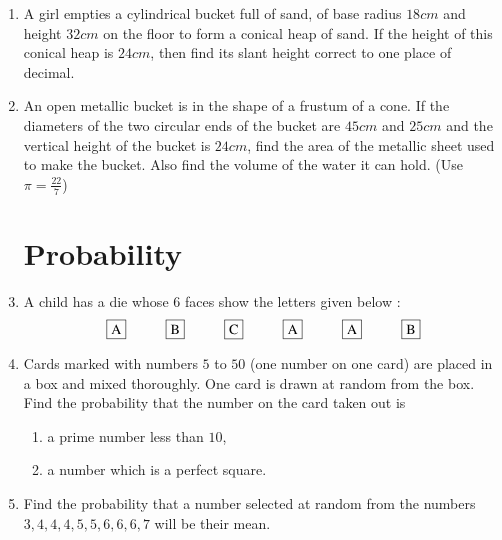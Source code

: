 \documentclass[2pt,-letter paper]{article}
\begin{document}
\begin{enumerate}
\item A girl empties a cylindrical bucket full of sand, of base radius $18 cm$ and height $32 cm$ on the floor to form a conical heap of sand. If the height of this conical heap is $24 cm$, then find its slant height correct to one place of decimal.

\item An open metallic bucket is in the shape of a frustum of a cone. If the diameters of the two circular ends of the bucket are $45 cm$ and $25 cm$ and the vertical height of the bucket is $24 cm$, find the area of the metallic sheet used to make the bucket. Also find the volume of the water it can 
hold. (Use $\pi =\frac{22}{7}$)

\section{Probability}

\item A child has a die whose $6$ faces show the letters given below :
\begin{align*}
    { \framebox {A} \hspace{1cm}} {\framebox {B} \hspace{1cm}} {\framebox {C}\hspace{1cm}} {\framebox {A}\hspace{1cm}} {\framebox {A}\hspace{1cm}} {\framebox {B}}
\end{align*}

\item Cards marked with numbers $5$ to $50$ (one number on one card) are placed in a box and mixed thoroughly. One card is drawn at random from the box. Find the probability that the number on the card taken out is \begin{enumerate}
    \item a prime number less than $10$,  
    \item a number which is a perfect square.
\end{enumerate}

\item Find the probability that a number selected at random from the numbers $3, 4, 4, 4, 5, 5, 6, 6, 6, 7$ will be their mean.


\end{enumerate}
\end{document}
